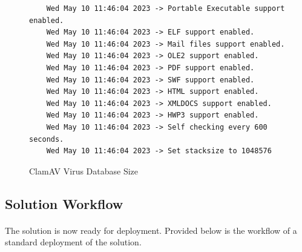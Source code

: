 \documentclass[12pt, conference, final, a4paper, onecolumn, compsoc]{IEEEtran}
\begin{document}
\begin{figure}[H]
\begin{lstlisting}
    Wed May 10 11:46:04 2023 -> Portable Executable support enabled.
    Wed May 10 11:46:04 2023 -> ELF support enabled.
    Wed May 10 11:46:04 2023 -> Mail files support enabled.
    Wed May 10 11:46:04 2023 -> OLE2 support enabled.
    Wed May 10 11:46:04 2023 -> PDF support enabled.
    Wed May 10 11:46:04 2023 -> SWF support enabled.
    Wed May 10 11:46:04 2023 -> HTML support enabled.
    Wed May 10 11:46:04 2023 -> XMLDOCS support enabled.
    Wed May 10 11:46:04 2023 -> HWP3 support enabled.
    Wed May 10 11:46:04 2023 -> Self checking every 600 seconds.
    Wed May 10 11:46:04 2023 -> Set stacksize to 1048576
  \end{lstlisting}
    \caption{ClamAV Virus Database Size}
    \label{fig:clamav-db}
\end{figure}

\subsection{Solution Workflow}
\paragraph{}
The solution is now ready for deployment. Provided below is the workflow of a
standard deployment of the solution.
\end{document}
